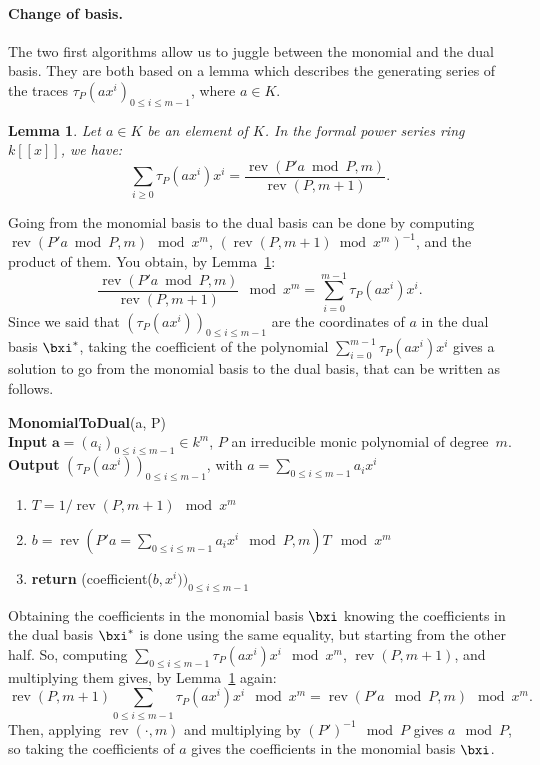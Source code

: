 \documentclass[a4paper,11pt]{article}
\theoremstyle{break}
\newtheorem{lm}[thm]{Lemma}
\theoremstyle{definition}
\theoremstyle{remark}
\DeclareMathOperator{\rev}{rev}
\begin{document}
\paragraph{Change of basis.}The two
first algorithms allow us to juggle between the monomial and the dual basis. They are
both based on a lemma which describes the generating series of the traces
$\tau_P(ax^i)_{0\leq i \leq m-1}$, where $a\in K$. 
\begin{lm}
  \label{lm-basis}
  Let $a\in K$ be an element of $K$. In the formal power series ring $k[[x]]$,
  we have:
  \[
    \sum_{i\geq 0}\tau_P(ax^i)x^i=\frac{\rev(P'a\bmod P,m)}{\rev(P,m+1)}.
  \]
\end{lm}
Going from the monomial basis to the dual basis can be done by computing
$\rev(P'a\bmod P,m)\mod x^m$, $(\rev(P,m+1)\bmod x^m)^{-1}$, and the product of
them. You obtain, by Lemma~\ref{lm-basis}:
\[
  \frac{\rev(P'a\bmod P,m)}{\rev(P,m+1)}\mod x^m=\sum_{i=0}^{m-1}\tau_P(ax^i)x^i.
\]
Since we said that
$(\tau_P(ax^i))_{0\leq i \leq m-1}$ are the coordinates of $a$ in the dual basis
$\bxi^*$, taking the coefficient of the polynomial
$\sum_{i=0}^{m-1}\tau_P(ax^i)x^i$ gives a solution to go from the monomial basis
to the dual basis, that can be written as follows.
\newline

\textbf{MonomialToDual}(a, P)\\
\textbf{Input} $\textbf{a}=(a_i)_{0\leq i\leq m-1}\in k^m$, $P$ an irreducible
monic polynomial of degree~$m$.\\
\textbf{Output} $(\tau_P(ax^i))_{0\leq i \leq m-1}$, with $a=\sum_{0\leq i
\leq m-1}a_ix^i$
\begin{enumerate}
  \item $T=1/\rev(P,m+1) \mod x^m$
  \item $b=\rev(P'a=\sum_{0\leq i\leq m-1}a_ix^i \mod P,m)T\mod x^m$
  \item \textbf{return} (coefficient($b,x^i))_{0\leq i \leq m-1}$
\end{enumerate}

Obtaining the coefficients in the monomial basis $\bxi$
knowing the coefficients in the dual basis $\bxi^*$ is done using the same
equality, but starting from the other half. So, computing $\sum_{0\leq i \leq
m-1}\tau_P(ax^i)x^i \mod x^m$, $\rev(P,m+1)$, and multiplying them gives, by
Lemma~\ref{lm-basis} again: 
\[
\rev(P,m+1)\sum_{0\leq i \leq m-1}\tau_P(ax^i)x^i \mod x^m = \rev(P'a\mod P,m) 
\mod x^m.
\]
Then, applying $\rev(\cdot,m)$ and multiplying by $(P')^{-1}\mod P$ gives $a\mod
P$, so taking the coefficients of $a$ gives the coefficients in the monomial
basis $\bxi$.
\newline
\end{document}
